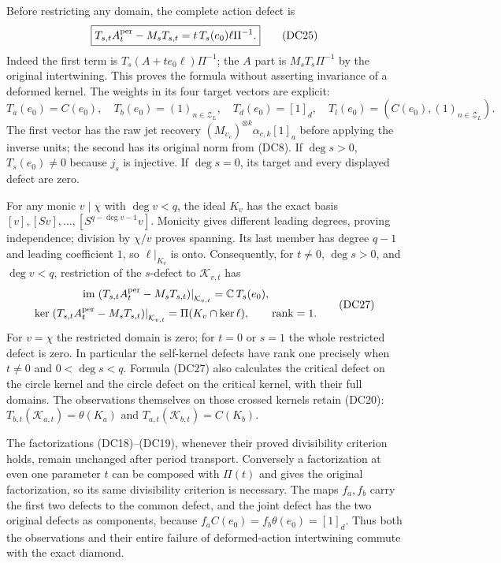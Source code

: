 Before restricting any domain, the complete action defect is
\[
 \boxed{
 T_{s,t}A_t^{\rm per}-M_sT_{s,t}
       =t\,T_s(e_0)\ell\Pi^{-1}.}
 \tag{DC25}
\]
Indeed the first term is $T_s(A+t e_0\ell)\Pi^{-1}$;
the $A$ part is $M_sT_s\Pi^{-1}$ by the original intertwining.
This proves the formula without asserting invariance of a
deformed kernel.  The weights in its four target vectors are
explicit:
\[
 T_a(e_0)=C(e_0),\quad
 T_b(e_0)=(1)_{n\in\mathcal Z_L},\quad
 T_d(e_0)=[1]_d,\quad
 T_l(e_0)=(C(e_0),(1)_{n\in\mathcal Z_L}).
 \tag{DC26}
\]
The first vector has the raw jet recovery
$(M_{\upsilon_c})^{\otimes k}\alpha_{c,k}[1]_a$ before applying
the inverse units; the second has its original norm from (DC8).
If $\deg s>0$, $T_s(e_0)\ne0$ because $j_s$ is injective.
If $\deg s=0$, its target and every displayed defect are zero.

For any monic $v\mid\chi$ with $\deg v<q$, the ideal $K_v$
has the exact basis
$[v],[Sv],\ldots,[S^{q-\deg v-1}v]$.  Monicity gives different
leading degrees, proving independence; division by $\chi/v$
proves spanning.  Its last member has degree $q-1$ and leading
coefficient $1$, so $\ell|_{K_v}$ is onto.  Consequently, for
$t\ne0$, $\deg s>0$, and $\deg v<q$, restriction of the
$s$-defect to $\mathcal K_{v,t}$ has
\[
 \begin{gathered}
 \operatorname{im}
 \left.(T_{s,t}A_t^{\rm per}-M_sT_{s,t})\right|_{\mathcal K_{v,t}}
      =\mathbb C\,T_s(e_0),\\
 \ker
 \left.(T_{s,t}A_t^{\rm per}-M_sT_{s,t})\right|_{\mathcal K_{v,t}}
      =\Pi(K_v\cap\ker\ell),\qquad
 \operatorname{rank}=1 .
 \end{gathered}
 \tag{DC27}
\]
For $v=\chi$ the restricted domain is zero; for $t=0$ or $s=1$
the whole restricted defect is zero.  In particular the
self-kernel defects have rank one precisely when
$t\ne0$ and $0<\deg s<q$.  Formula (DC27) also calculates the
critical defect on the circle kernel and the circle defect on the
critical kernel, with their full domains.
The observations themselves on those crossed kernels retain
(DC20):
$T_{b,t}(\mathcal K_{a,t})=\theta(K_a)$ and
$T_{a,t}(\mathcal K_{b,t})=C(K_b)$.

The factorizations (DC18)--(DC19), whenever their proved
divisibility criterion holds, remain unchanged after period
transport.  Conversely a factorization at even one parameter
$t$ can be composed with $\Pi(t)$ and gives the original
factorization, so its same divisibility criterion is necessary.
The maps $f_a,f_b$ carry the first two defects to the common
defect, and the joint defect has the two original defects as
components, because $f_aC(e_0)=f_b\theta(e_0)=[1]_d$.
Thus both the observations and their entire failure of
deformed-action intertwining commute with the exact diamond.

